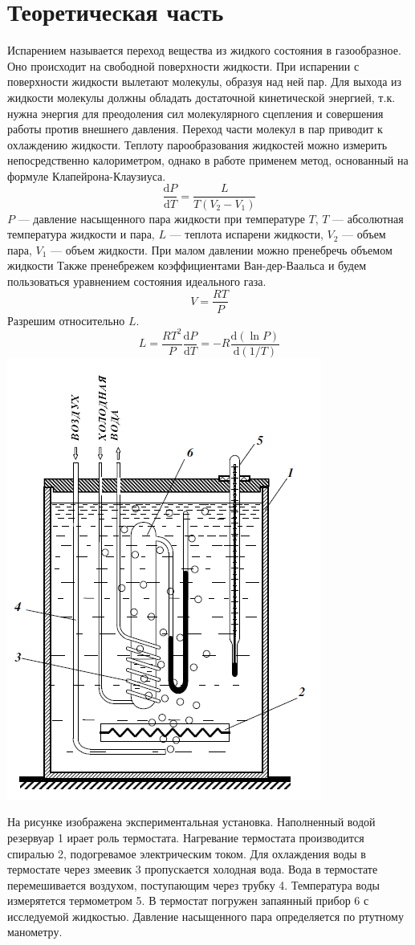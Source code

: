 \documentclass[a4paper,12pt]{article}
\newcommand{\dif}{\mathrm{d}}
\begin{document}
	\section{Теоретическая часть}
	Испарением называется переход вещества из жидкого состояния в газообразное. Оно происходит на свободной поверхности жидкости. При испарении с поверхности жидкости вылетают молекулы, образуя над ней пар. Для выхода из жидкости молекулы должны обладать достаточной кинетической энергией, т.к. нужна энергия для преодоления сил молекулярного сцепления и совершения работы против внешнего давления. Переход части молекул в пар приводит к охлаждению жидкости. Теплоту парообразования жидкостей можно измерить непосредственно калориметром, однако в работе применем метод, основанный на формуле Клапейрона-Клаузиуса.
	\begin{equation}
		\frac{\dif P}{\dif T} = \frac{L}{T\left(V_2-V_1\right)}
	\end{equation}
	$P$ --- давление насыщенного пара жидкости при температуре $T$, $T$ --- абсолютная температура жидкости и пара, $L$ --- теплота испарени жидкости, $V_2$ --- объем пара, $V_1$ --- объем жидкости. При малом давлении можно пренебречь объемом жидкости
	Также пренебрежем коэффициентами Ван-дер-Ваальса и будем пользоваться уравнением состояния идеального газа.
	\begin{equation}
		V  = \frac{RT}{P}
	\end{equation}
	Разрешим относительно $L$.
	\begin{equation}
		L = \frac{RT^2}{P}\frac{\dif P}{\dif T} = -R\frac{\dif\left(\ln P\right)}{\dif\left( 1/T \right)}
	\end{equation}
	\includegraphics[width = 0.4\linewidth]{instrument}
	
	На рисунке изображена экспериментальная установка. Наполненный водой резервуар 1 ирает роль термостата. Нагревание термостата производится спиралью 2, подогревамое электрическим током. Для охлаждения воды в термостате через змеевик 3 пропускается холодная вода. Вода в термостате перемешивается воздухом, поступающим через трубку 4. Температура воды измерятется термометром 5. В термостат погружен запаянный прибор 6 с исследуемой жидкостью.
	Давление насыщенного пара определяется по ртутному манометру.
\end{document}
